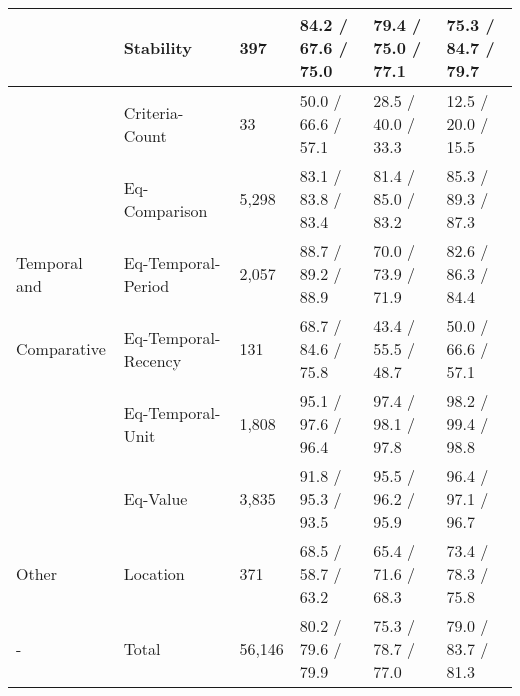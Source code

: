 \begin{tabular}{m{2cm} m{3.2cm} m{1.4cm} m{2.7cm} m{2.7cm} m{2.7cm}}
         & Stability & 397 & 84.2 / 67.6 / 75.0 & 79.4 / 75.0 / 77.1 & 75.3 / 84.7 / 79.7 \\
    \hline
      &
        Criteria-Count & 33 & 50.0 / 66.6 / 57.1 & 28.5 / 40.0 / 33.3 & 12.5 / 20.0 / 15.5 \\
     & Eq-Comparison & 5,298 & 83.1 / 83.8 / 83.4 & 81.4 / 85.0 / 83.2 & 85.3 / 89.3 / 87.3 \\
     Temporal and & Eq-Temporal-Period & 2,057 & 88.7 / 89.2 / 88.9 & 70.0 / 73.9 / 71.9 & 82.6 / 86.3 / 84.4 \\
     Comparative & Eq-Temporal-Recency & 131 & 68.7 / 84.6 / 75.8 & 43.4 / 55.5 / 48.7 & 50.0 / 66.6 / 57.1 \\
     & Eq-Temporal-Unit & 1,808 & 95.1 / 97.6 / 96.4 & 97.4 / 98.1 / 97.8 & 98.2 / 99.4 / 98.8 \\
     & Eq-Value & 3,835 & 91.8 / 95.3 / 93.5 & 95.5 / 96.2 / 95.9 & 96.4 / 97.1 / 96.7  \\
    \hline   
    Other &
        Location & 371 & 68.5 / 58.7 / 63.2 & 65.4 / 71.6 / 68.3 & 73.4 / 78.3 / 75.8 \\
    \hline
    - & Total & 56,146 & 80.2 / 79.6 / 79.9 & 75.3 / 78.7 / 77.0 & 79.0 / 83.7 / 81.3 \\
    
\end{tabular}

